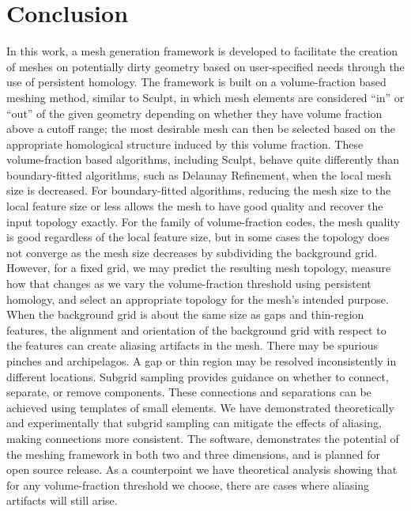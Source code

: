 \section{Conclusion}

In this work, a mesh generation framework is developed to facilitate the creation of meshes on potentially dirty geometry based on user-specified needs through the use of persistent homology.
The framework is built on a volume-fraction based meshing method, similar to Sculpt, in which mesh elements are considered ``in'' or ``out'' of the given geometry depending on whether they have volume fraction above a cutoff range; the most desirable mesh can then be selected based on the  appropriate homological structure induced by this volume fraction.
These volume-fraction based algorithms, including Sculpt, behave quite differently than boundary-fitted algorithms, such as Delaunay Refinement, when the local mesh size is decreased. 
 For boundary-fitted algorithms, reducing the mesh size to the local feature size or less allows the mesh to have good quality and recover the input topology exactly. 
 For the family of volume-fraction codes, the mesh quality is good regardless of the local feature size, but in some cases the topology does not converge as the mesh size decreases by subdividing the background grid. 
 However, for a fixed grid, we may predict the resulting mesh topology, measure how that changes as we vary the volume-fraction threshold using persistent homology, and select an appropriate topology for the mesh's intended purpose. 
When the background grid is about the same size as gaps and thin-region features, the alignment and orientation of the background grid with respect to the features can create aliasing artifacts in the mesh.
There may be spurious pinches and archipelagos.
A gap or thin region may be resolved inconsistently in different locations.
Subgrid sampling provides guidance on whether to connect, separate, or remove components.
These connections and separations can be achieved using templates of small elements. 
We have demonstrated theoretically and experimentally that subgrid sampling can mitigate the effects of aliasing, making connections more consistent.
The software, \briancode{,} demonstrates the potential of the meshing framework in both two and three dimensions, and is planned for open source release.
As a counterpoint we have theoretical analysis showing that for any volume-fraction threshold we choose, there are cases where aliasing artifacts will still arise.


